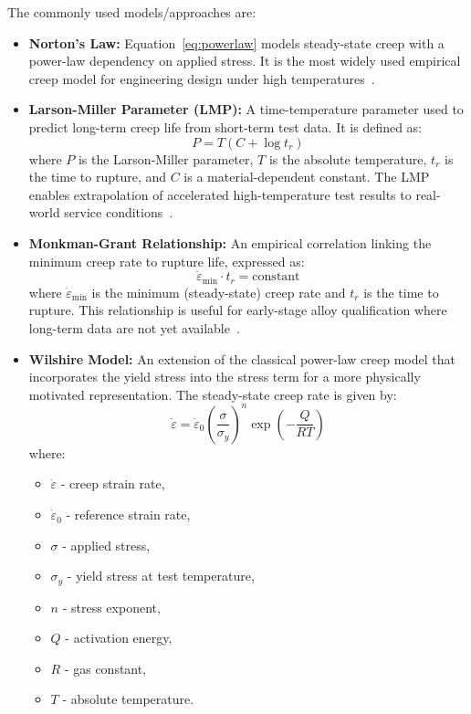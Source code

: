 \documentclass[class=scrbook, crop=false]{standalone}
\begin{document}
The commonly used models/approaches are:
\begin{itemize}
	\item \textbf{Norton’s Law:} 
	Equation~\ref{eq:powerlaw} models steady-state creep with a power-law dependency on applied stress. It is the most widely used empirical creep model for engineering design under high temperatures~\cite{norton1929creep}.
	
	\item \textbf{Larson-Miller Parameter (LMP):} 
	A time-temperature parameter used to predict long-term creep life from short-term test data. It is defined as:
	\[
	P = T(C + \log t_r)
	\]
	where \( P \) is the Larson-Miller parameter, \( T \) is the absolute temperature, \( t_r \) is the time to rupture, and \( C \) is a material-dependent constant. The LMP enables extrapolation of accelerated high-temperature test results to real-world service conditions~\cite{larson1954time}.
	
	\item \textbf{Monkman-Grant Relationship:}  
	An empirical correlation linking the minimum creep rate to rupture life, expressed as:
	\[
	\dot{\varepsilon}_{\text{min}} \cdot t_r = \text{constant}
	\]
	where \( \dot{\varepsilon}_{\text{min}} \) is the minimum (steady-state) creep rate and \( t_r \) is the time to rupture. This relationship is useful for early-stage alloy qualification where long-term data are not yet available~\cite{monkman1956relationship}.
	
	\item \textbf{Wilshire Model:}  
	An extension of the classical power-law creep model that incorporates the yield stress into the stress term for a more physically motivated representation. The steady-state creep rate is given by:
	\[
	\dot{\varepsilon} = \dot{\varepsilon}_0 \left( \frac{\sigma}{\sigma_y} \right)^n \exp\left(-\frac{Q}{RT}\right)
	\]
	where:
	\begin{itemize}
		\item \( \dot{\varepsilon} \) - creep strain rate,
		\item \( \dot{\varepsilon}_0 \) - reference strain rate,
		\item \( \sigma \) - applied stress,
		\item \( \sigma_y \) - yield stress at test temperature,
		\item \( n \) - stress exponent,
		\item \( Q \) - activation energy,
		\item \( R \) - gas constant,
		\item \( T \) - absolute temperature.
	\end{itemize}
	

\end{itemize}
\end{document}
